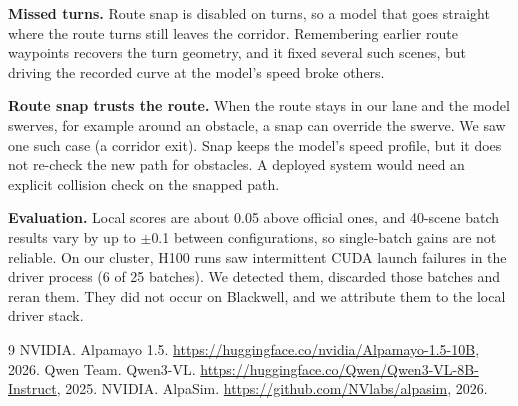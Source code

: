 \documentclass{article}
\begin{document}
\textbf{Missed turns.} Route snap is disabled on turns, so a model that goes straight where the route turns still
leaves the corridor. Remembering earlier route waypoints recovers the turn geometry, and it fixed several such scenes,
but driving the recorded curve at the model's speed broke others.

\textbf{Route snap trusts the route.} When the route stays in our lane and the model swerves, for example around an
obstacle, a snap can override the swerve. We saw one such case (a corridor exit). Snap keeps the model's speed
profile, but it does not re-check the new path for obstacles. A deployed system would need an explicit
collision check on the snapped path.

\textbf{Evaluation.} Local scores are about 0.05 above official ones, and 40-scene batch results vary by up to
$\pm$0.1 between configurations, so single-batch gains are not reliable. On our cluster, H100 runs saw intermittent
CUDA launch failures in the driver process (6 of 25 batches). We detected them, discarded those batches and reran
them. They did not occur on Blackwell, and we attribute them to the local driver stack.

\begin{thebibliography}{9}
 NVIDIA. \newblock Alpamayo 1.5. \newblock \url{https://huggingface.co/nvidia/Alpamayo-1.5-10B}, 2026.
 Qwen Team. \newblock Qwen3-VL. \newblock \url{https://huggingface.co/Qwen/Qwen3-VL-8B-Instruct}, 2025.
 NVIDIA. \newblock AlpaSim. \newblock \url{https://github.com/NVlabs/alpasim}, 2026.
\end{thebibliography}
\end{document}
